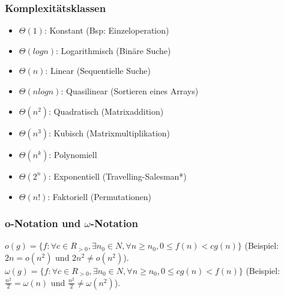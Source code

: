 \documentclass{article}
\begin{document}
            \subsubsection{Komplexitätsklassen}
                \begin{itemize}
                    \item $\Theta(1)$: Konstant (Bsp: Einzeloperation)
                    \item $\Theta(log n)$: Logarithmisch (Binäre Suche)
                    \item $\Theta(n)$: Linear (Sequentielle Suche)
                    \item $\Theta(n log n)$: Quasilinear (Sortieren eines Arrays)
                    \item $\Theta(n^2)$: Quadratisch (Matrixaddition)
                    \item $\Theta(n^3)$: Kubisch (Matrixmultiplikation)
                    \item $\Theta(n^k)$: Polynomiell
                    \item $\Theta(2^n)$: Exponentiell (Travelling-Salesman*)
                    \item $\Theta(n!)$: Faktoriell (Permutationen)
                \end{itemize}
            \subsubsection{o-Notation und $\omega$-Notation}
                $o(g)=\{f:\forall c\in R_{>0},\exists n_0\in N,\forall n \geq n_0,0\leq f(n)< cg(n)\}$ (Beispiel: $2n=o(n^2)$ und $2n^2\neq o(n^2)$).\\
                $\omega(g)=\{f:\forall c\in R_{>0},\exists n_0\in N,\forall n \geq n_0,0\leq cg(n)< f(n)\}$ (Beispiel: $\frac{n^2}{2}=\omega(n)$ und $\frac{n^2}{2} \neq \omega(n^2)$).\\
\end{document}
